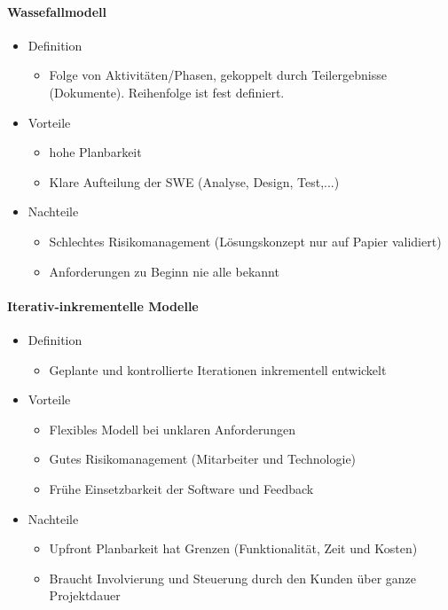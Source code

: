 \documentclass[../ZF_SWEN1.tex]{subfiles}
\begin{document}
\paragraph{Wassefallmodell}
\begin{itemize}
    \item Definition
    \begin{itemize}
        \item Folge von Aktivitäten/Phasen, gekoppelt durch Teilergebnisse (Dokumente). Reihenfolge ist fest definiert.
    \end{itemize}
    \item Vorteile
    \begin{itemize}
        \item hohe Planbarkeit
        \item Klare Aufteilung der SWE (Analyse, Design, Test,...)

      \end{itemize}
    \item Nachteile
    \begin{itemize}
        \item Schlechtes Risikomanagement (Lösungskonzept nur auf Papier validiert)
        \item Anforderungen zu Beginn nie alle bekannt
    \end{itemize}
\end{itemize}

\paragraph{Iterativ-inkrementelle Modelle}
\begin{itemize}
    \item Definition
    \begin{itemize}
        \item Geplante und kontrollierte Iterationen inkrementell entwickelt
    \end{itemize}
    \item Vorteile
    \begin{itemize}
        \item Flexibles Modell bei unklaren Anforderungen
        \item Gutes Risikomanagement (Mitarbeiter und Technologie)
        \item Frühe Einsetzbarkeit der Software und Feedback
    \end{itemize}
    \item Nachteile
    \begin{itemize}
        \item Upfront Planbarkeit hat Grenzen (Funktionalität, Zeit und Kosten)
        \item Braucht Involvierung und Steuerung durch den Kunden über ganze Projektdauer
    \end{itemize}
\end{itemize}
\end{document}
